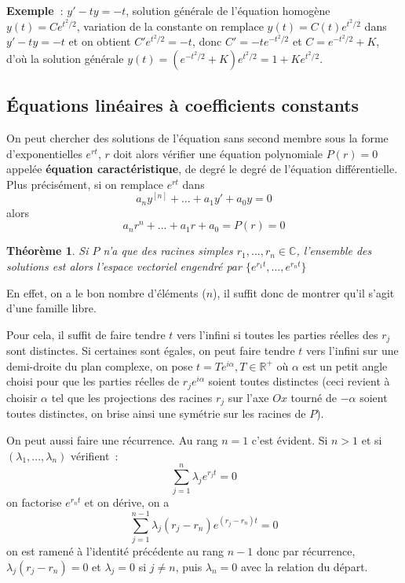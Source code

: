 \documentclass[a4paper,11pt]{book}
\newtheorem{thm}{Théorème}
\begin{document}
\begin{giacjshere}
{\bf Exemple~}: $y'-ty=-t$, solution g\'en\'erale de l'\'equation
homog\`ene $y(t)=Ce^{t^2/2}$, variation de la constante
on remplace $y(t)=C(t)e^{t^2/2}$ dans $y'-ty=-t$ et on obtient
$C' e^{t^2/2}=-t$, donc $C'=-te^{-t^2/2}$ et $C=e^{-t^2/2}+K$,
d'o\`u la solution g\'en\'erale $y(t)=(e^{-t^2/2}+K)e^{t^2/2}=1+Ke^{t^2/2}$.

\subsection{\'Equations lin\'eaires \`a coefficients constants}
On peut chercher des solutions de l'\'equation sans second membre
sous la forme d'exponentielles
$e^{rt}$, $r$ doit alors v\'erifier une \'equation polynomiale $P(r)=0$
appel\'ee {\bf \'equation caract\'eristique},
de degr\'e le degr\'e de l'\'equation diff\'erentielle. 
Plus pr\'ecis\'ement, si on remplace $e^{rt}$ dans
$$ a_n y^{[n]}+...+a_1 y'+a_0y=0$$ alors
$$ a_n r^n +...+a_1r +a_0=P(r)=0$$
\begin{thm}
Si  $P$ n'a que des racines simples $r_1,...,r_n \in \mathbb{C}$, 
l'ensemble des solutions
est alors l'espace vectoriel engendr\'e par 
$\{ e^{r_1t}, ... , e^{r_nt} \}$
\end{thm}
En effet, on a le bon nombre
d'\'el\'ements ($n$), il suffit donc de montrer 
qu'il s'agit d'une famille libre. 

Pour cela, il suffit de faire tendre $t$ vers l'infini
si toutes les parties r\'eelles des $r_j$ sont distinctes. Si
certaines sont \'egales, on peut faire tendre $t$ vers l'infini
sur une demi-droite du plan complexe, 
on pose $t=Te^{i\alpha}, T \in \mathbb{R}^+$ 
o\`u $\alpha$ est un petit angle
choisi pour que les parties r\'eelles de $r_je^{i\alpha}$ 
soient toutes distinctes (ceci revient \`a choisir $\alpha$
tel que les projections des racines $r_j$ 
sur l'axe $Ox$ tourn\'e de $-\alpha$ soient toutes distinctes,
on brise ainsi une sym\'etrie sur les racines de $P$).

On peut aussi faire une r\'ecurrence. Au rang $n=1$ c'est \'evident.
Si $n>1$ et si $(\lambda_1,...,\lambda_n)$ v\'erifient~:
$$ \sum_{j=1}^n \lambda_j e^{r_jt} = 0$$
on factorise $e^{r_n t}$ et on d\'erive, on a
$$ \sum_{j=1}^{n-1} \lambda_j (r_j-r_n) e^{(r_j-r_n)t} =0 $$
on est ramen\'e \`a l'identit\'e pr\'ec\'edente au rang $n-1$
donc par r\'ecurrence, $\lambda_j (r_j-r_n)=0$ et $\lambda_j=0$
si $j \neq n$, puis $\lambda_n=0$ avec la relation du d\'epart.


\end{giacjshere}
\end{document}
